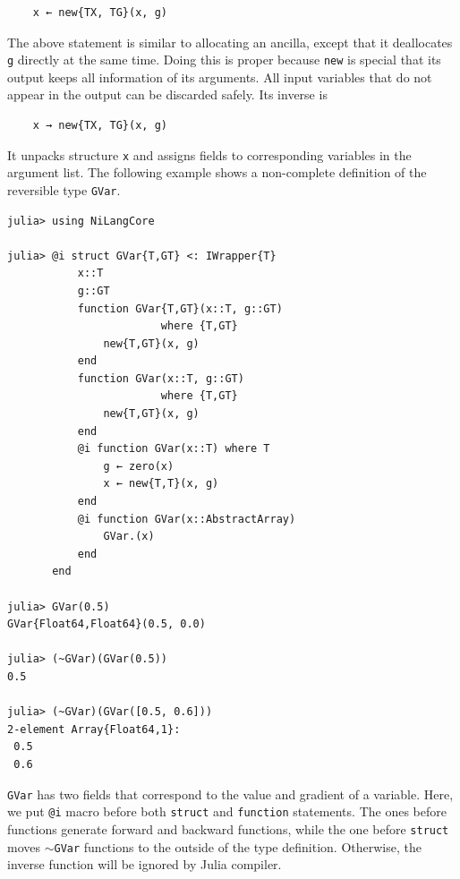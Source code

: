 \documentclass{article}
\newcommand{\<}{\langle}
\renewcommand{\>}{\rangle}
\theoremstyle{definition}\newtheorem{definition}{\textit{Definition}}
\begin{document}
\begin{minipage}{.88\columnwidth}
\begin{lstlisting}
    x ← new{TX, TG}(x, g)
\end{lstlisting}
\end{minipage}

The above statement is similar to allocating an ancilla, except that it deallocates \texttt{g} directly at the same time.
Doing this is proper because \texttt{new} is special that its output keeps all information of its arguments. All input variables that do not appear in the output can be discarded safely. Its inverse is

\begin{minipage}{.88\columnwidth}
\begin{lstlisting}
    x → new{TX, TG}(x, g)
\end{lstlisting}
\end{minipage}

It unpacks structure \texttt{x} and assigns fields to corresponding variables in the argument list.
The following example shows a non-complete definition of the reversible type \texttt{GVar}.

\begin{minipage}{\columnwidth}
\begin{lstlisting}[multicols=2]
julia> using NiLangCore

julia> @i struct GVar{T,GT} <: IWrapper{T}
           x::T
           g::GT
           function GVar{T,GT}(x::T, g::GT)
                        where {T,GT}
               new{T,GT}(x, g)
           end
           function GVar(x::T, g::GT)
                        where {T,GT}
               new{T,GT}(x, g)
           end
           @i function GVar(x::T) where T
               g ← zero(x)
               x ← new{T,T}(x, g)
           end
           @i function GVar(x::AbstractArray)
               GVar.(x)
           end
       end

julia> GVar(0.5)
GVar{Float64,Float64}(0.5, 0.0)

julia> (~GVar)(GVar(0.5))
0.5

julia> (~GVar)(GVar([0.5, 0.6]))
2-element Array{Float64,1}:
 0.5
 0.6
\end{lstlisting}
\end{minipage}

\texttt{GVar} has two fields that correspond to the value and gradient of a variable.
Here, we put \texttt{@i} macro before both \texttt{struct} and \texttt{function} statements.
The ones before functions generate forward and backward functions, while the one before \texttt{struct} moves \texttt{$\sim$GVar} functions to the outside of the type definition. Otherwise, the inverse function will be ignored by Julia compiler.
\end{document}
